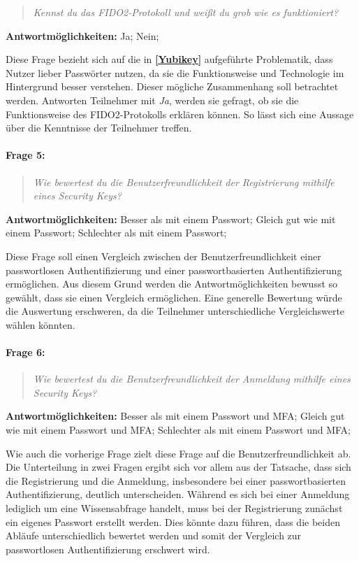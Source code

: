 \begin{quote}
    \textit{Kennst du das FIDO2-Protokoll und weißt du grob wie es funktioniert?}
\end{quote}

\textbf{Antwortmöglichkeiten:} Ja; Nein;

Diese Frage bezieht sich auf die in \textbf{\ref{Yubikey}} aufgeführte Problematik, dass Nutzer lieber Passwörter nutzen, da sie die Funktionsweise und Technologie im Hintergrund besser verstehen. Dieser mögliche Zusammenhang soll betrachtet werden. Antworten Teilnehmer mit \textit{Ja}, werden sie gefragt, ob sie die Funktionsweise des FIDO2-Protokolls erklären können. So lässt sich eine Aussage über die Kenntnisse der Teilnehmer treffen. 

\paragraph{Frage 5:}

\begin{quote}
    \textit{Wie bewertest du die Benutzerfreundlichkeit der Registrierung mithilfe eines Security Keys?}
\end{quote}

\textbf{Antwortmöglichkeiten:} Besser als mit einem Passwort; Gleich gut wie mit einem Passwort; Schlechter als mit einem Passwort;

Diese Frage soll einen Vergleich zwischen der Benutzerfreundlichkeit einer passwortlosen Authentifizierung und einer passwortbasierten Authentifizierung ermöglichen. Aus diesem Grund werden die Antwortmöglichkeiten bewusst so gewählt, dass sie einen Vergleich ermöglichen. Eine generelle Bewertung würde die Auswertung erschweren, da die Teilnehmer unterschiedliche Vergleichswerte wählen könnten.

\paragraph{Frage 6:}

\begin{quote}
    \textit{Wie bewertest du die Benutzerfreundlichkeit der Anmeldung mithilfe eines Security Keys?}
\end{quote}

\textbf{Antwortmöglichkeiten:} Besser als mit einem Passwort und \ac{MFA}; Gleich gut wie mit einem Passwort und \ac{MFA}; Schlechter als mit einem Passwort und \ac{MFA};

Wie auch die vorherige Frage zielt diese Frage auf die Benutzerfreundlichkeit ab. Die Unterteilung in zwei Fragen ergibt sich vor allem aus der Tatsache, dass sich die Registrierung und die Anmeldung, insbesondere bei einer passwortbasierten Authentifizierung, deutlich unterscheiden. Während es sich bei einer Anmeldung lediglich um eine Wissensabfrage handelt, muss bei der Registrierung zunächst ein eigenes Passwort erstellt werden. Dies könnte dazu führen, dass die beiden Abläufe unterschiedlich bewertet werden und somit der Vergleich zur passwortlosen Authentifizierung erschwert wird.

